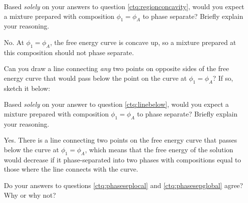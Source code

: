 \begin{activity}
\begin{ctqs}
\begin{enumerate}
			\end{enumerate}
			
		\question \label{ctq:phaseseplocal} Based \emph{solely} on your answers to question \ref{ctq:regionconcavity}, would you expect a mixture prepared with composition $\phi_1 = \phi_A$ to phase separate?  Briefly explain your reasoning.
					
					\begin{solution}[1.75in]
					
						No. At $\phi_1 = \phi_A$, the free energy curve is concave up, so a mixture prepared at this composition should not phase separate.
					
					\end{solution}
		
		\question \label{ctq:linebelow} Can you draw a line connecting \emph{any} two points on opposite sides of the free energy curve that would pass below the point on the curve at $\phi_1=\phi_A$?  If so, sketch it below:

			\begin{solution}[2.5in]
			\end{solution}
		
		\question \label{ctq:phasesepglobal} Based \emph{solely} on your answer to question \ref{ctq:linebelow}, would you expect a mixture prepared with composition $\phi_1 = \phi_A$ to phase separate?  Briefly explain your reasoning.
		
			\begin{solution}[1.5in]
			
				Yes.  There is a line connecting two points on the free energy curve that passes below the curve at $\phi_1 = \phi_A$, which means that the free energy of the solution would decrease if it phase-separated into two phases with compositions equal to those where the line connects with the curve.
				
			\end{solution}
		
		\question Do your answers to questions \ref{ctq:phaseseplocal} and \ref{ctq:phasesepglobal} agree?  Why or why not?
		

\end{ctqs}
\end{activity}

